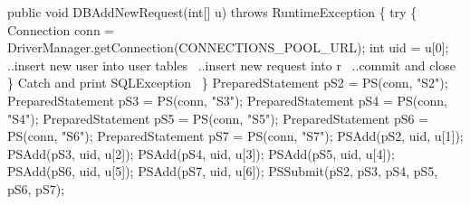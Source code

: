 \documentclass{article}
\def\nwendcode{\endtrivlist \endgroup}      %
\let\nwdocspar=\par
\theoremstyle{definition}                   %
\begin{document}
\nwenddocs{}\endmoddef{}
public void DBAddNewRequest(int[] u) throws RuntimeException \{
  try \{
    Connection conn = DriverManager.getConnection(CONNECTIONS_POOL_URL);
    int uid = u[0];
    \LA{}..insert new user into user tables~{\nwtagstyle{}}\RA{}
    \LA{}..insert new request into r~{\nwtagstyle{}}\RA{}
    \LA{}..commit and close~{\nwtagstyle{}}\RA{}
  \}
  \LA{}Catch and print \code{}SQLException\edoc{}~{\nwtagstyle{}}\RA{}
\}
\eatline
{}\nwendcode{}\endmoddef{}
PreparedStatement pS2 = PS(conn, "S2");
PreparedStatement pS3 = PS(conn, "S3");
PreparedStatement pS4 = PS(conn, "S4");
PreparedStatement pS5 = PS(conn, "S5");
PreparedStatement pS6 = PS(conn, "S6");
PreparedStatement pS7 = PS(conn, "S7");
PSAdd(pS2, uid, u[1]);
PSAdd(pS3, uid, u[2]);
PSAdd(pS4, uid, u[3]);
PSAdd(pS5, uid, u[4]);
PSAdd(pS6, uid, u[5]);
PSAdd(pS7, uid, u[6]);
PSSubmit(pS2, pS3, pS4, pS5, pS6, pS7);
\nwendcode{}\nwdocspar
\end{document}
